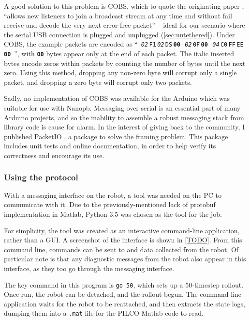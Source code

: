 \documentclass[main.tex]{subfiles}
\begin{document}
		A good solution to this problem is COBS, which to quote the originating paper \cite{cobs}, \enquote{allows new listeners to join a broadcast stream at any time and without fail receive and decode the very next error free packet} -- ideal for our scenario where the serial USB connection is plugged and unplugged (\cref{sec:untethered}). Under COBS, the example packets are encoded as
		\mbox{\enquote{%
			\textit{\texttt{02}}\,\texttt{F1}\,\textit{\texttt{02}}\,\texttt{DS}\,\textbf{\texttt{00}}\,%
			\textit{\texttt{02}}\,\texttt{0F}\,\textbf{\texttt{00}}\,%
			\textit{\texttt{04}}\,\texttt{C0}\,\texttt{FF}\,\texttt{EE}\,\textbf{\texttt{00}}%
		}}, with \textbf{\texttt{00}} bytes appear only at the end of each packet.
		The italic inserted bytes encode zeros within packets by counting the number of bytes until the next zero.
		Using this method, dropping any non-zero byte will corrupt only a single packet, and dropping a zero byte will corrupt only two packets.

		Sadly, no implementation of COBS was available for the Arduino which was suitable for use with Nanopb\footnotemark.
		Messaging over serial is an essential part of many Arduino projects, and so the inability to assemble a robust messaging stack from library code is cause for alarm.
		In the interest of giving back to the community, I published PacketIO \cite{packetio}, a package to solve the framing problem.
		This package includes unit tests and online documentation, in order to help verify its correctness and encourage its use.


	\subsubsection{Using the protocol}

		With a messaging interface on the robot, a tool was needed on the PC to communicate with it.
		Due to the previously-mentioned lack of protobuf implementation in Matlab, Python 3.5 was chosen as the tool for the job.

		For simplicity, the tool was created as an interactive command-line application, rather than a GUI.
		A screenshot of the interface is shown in \cref{TODO}.
		From this command line, commands can be sent to and data collected from the robot.
		Of particular note is that any diagnostic messages from the robot also appear in this interface, as they too go through the messaging interface.

		The key command in this program is \texttt{go 50}, which sets up a 50-timestep rollout.
		Once run, the robot can be detached, and the rollout begun.
		The command-line application waits for the robot to be reattached, and then extracts the state logs, dumping them into a \texttt{.mat} file for the PILCO Matlab code to read.


\bib
\end{document}
